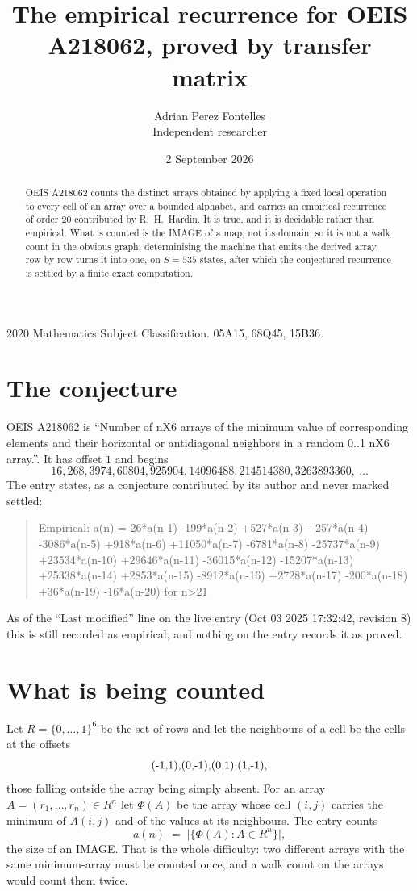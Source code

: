 \documentclass[11pt,a4paper]{article}
\title{The empirical recurrence for OEIS A218062, proved by transfer matrix}
\author{Adrian Perez Fontelles\\ \small Independent researcher}
\date{2 September 2026}
\theoremstyle{plain}
\theoremstyle{definition}
\begin{document}
\maketitle

\begin{abstract}
OEIS A218062 counts the distinct arrays obtained by applying a fixed local operation to every cell
of an array over a bounded alphabet, and carries an empirical recurrence of order $20$
contributed by R.~H.~Hardin. It is true, and it is decidable rather than empirical. What is
counted is the IMAGE of a map, not its domain, so it is not a walk count in the obvious graph;
determinising the machine that emits the derived array row by row turns it into one, on
$S=535$ states, after which the conjectured recurrence is settled by a finite exact
computation.
\end{abstract}

\noindent\small 2020 Mathematics Subject Classification. 05A15, 68Q45, 15B36.\normalsize

\section{The conjecture}

OEIS A218062 is ``Number of nX6 arrays of the minimum value of corresponding elements and their horizontal or antidiagonal neighbors in a random 0..1 nX6 array.''. It has offset $1$ and begins
\[
16, 268, 3974, 60804, 925904, 14096488, 214514380, 3263893360,\ \dots
\]
The entry states, as a conjecture contributed by its author and never marked settled:
\begin{quote}
Empirical: a(n) = 26*a(n-1) -199*a(n-2) +527*a(n-3) +257*a(n-4) -3086*a(n-5) +918*a(n-6) +11050*a(n-7) -6781*a(n-8) -25737*a(n-9) +23534*a(n-10) +29646*a(n-11) -36015*a(n-12) -15207*a(n-13) +25338*a(n-14) +2853*a(n-15) -8912*a(n-16) +2728*a(n-17) -200*a(n-18) +36*a(n-19) -16*a(n-20) for n>21
\end{quote}
As of the ``Last modified'' line on the live entry (Oct 03 2025 17:32:42, revision 8) this is still
recorded as empirical, and nothing on the entry records it as proved.

\section{What is being counted}

Let $R=\{0,\dots,1\}^{6}$ be the set of rows and let the neighbours of
a cell be the cells at the offsets
\[
$(-1,1)$, $(0,-1)$, $(0,1)$, $(1,-1)$,
\]
those falling outside the array being simply absent. For an array
$A=(r_1,\dots,r_n)\in R^n$ let $\Phi(A)$ be the array whose cell $(i,j)$ carries the
minimum of $A(i,j)$ and of the values at its neighbours. The entry counts
\[
a(n)\;=\;\bigl|\{\Phi(A):A\in R^n\}\bigr| ,
\]
the size of an IMAGE. That is the whole difficulty: two different arrays with the same
minimum-array must be counted once, and a walk count on the arrays would count them twice.
\end{document}
